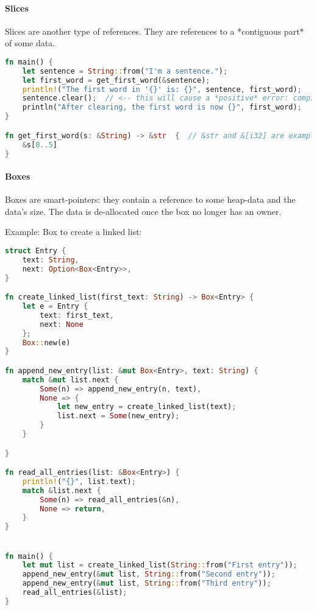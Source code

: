 \paragraph{Slices}
Slices are another type of references. They are references to a *contiguous part* of some data.

\begin{lstlisting}[language=rust]
fn main() {
    let sentence = String::from("I'm a sentence.");
    let first_word = get_first_word(&sentence);
    println!("The first word in '{}' is: {}", sentence, first_word);
    sentence.clear();  // <-- this will cause a *positive* error: compiler will warn us that the sentence's data is still in use somewhere.
    println("After clearing, the first word is now {}", first_word);
}

fn get_first_word(s: &String) -> &str  {  // &str and &[i32] are examples of slice-types
    &s[0..5]
}
\end{lstlisting}


\paragraph{Boxes}
Boxes are smart-pointers: they contain a reference to some heap-data and the data's size. The data is de-allocated once the box no longer has an owner.

Example: Box to create a linked list:
\begin{lstlisting}[language=rust]
struct Entry {
    text: String,
    next: Option<Box<Entry>>,
}

fn create_linked_list(first_text: String) -> Box<Entry> {
    let e = Entry {
        text: first_text,
        next: None
    };
    Box::new(e)
}

fn append_new_entry(list: &mut Box<Entry>, text: String) {
    match &mut list.next {
        Some(n) => append_new_entry(n, text),
        None => {
            let new_entry = create_linked_list(text);
            list.next = Some(new_entry);
        }
    }

}

fn read_all_entries(list: &Box<Entry>) {
    println!("{}", list.text);
    match &list.next {
        Some(n) => read_all_entries(&n),
        None => return,
    }
}


fn main() {
    let mut list = create_linked_list(String::from("First entry"));
    append_new_entry(&mut list, String::from("Second entry"));
    append_new_entry(&mut list, String::from("Third entry"));
    read_all_entries(&list);
}
\end{lstlisting}

